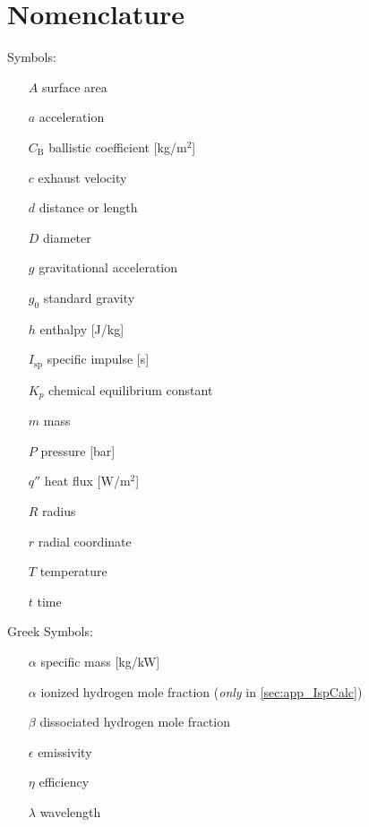 \documentclass[final,3p,times,twocolumn,sort&compress, lefttitle]{elsarticle}
\begin{document}
            
        \section{Nomenclature}
            \noindent Symbols:
            \begin{itemize}
                \item[$A$] surface area
                \item[$a$] acceleration
                \item[$C_\mathrm{B}$] ballistic coefficient [kg/m$^2$]
                \item[$c$] exhaust velocity
                \item[$d$] distance or length
                \item[$D$] diameter
                \item[$g$] gravitational acceleration
                \item[$g_0$] standard gravity
                \item[$h$] enthalpy [J/kg]
                \item[$I_\mathrm{sp}$] specific impulse [s]
                \item[$K_p$] chemical equilibrium constant
                \item[$m$] mass
                \item[$P$] pressure [bar]
                \item[$q''$] heat flux [W/m$^2$]
                \item[$R$] radius
                \item[$r$] radial coordinate
                \item[$T$] temperature
                \item[$t$] time
            \end{itemize}
            Greek Symbols:
            \begin{itemize}
                \item[$\alpha$] specific mass [kg/kW]
                \item[$\alpha$] ionized hydrogen mole fraction (\emph{only} in \ref{sec:app_IspCalc})
                \item[$\beta$] dissociated hydrogen mole fraction
                \item[$\epsilon$] emissivity
                \item[$\eta$] efficiency
                \item[$\lambda$] wavelength
            \end{itemize}
\end{document}
